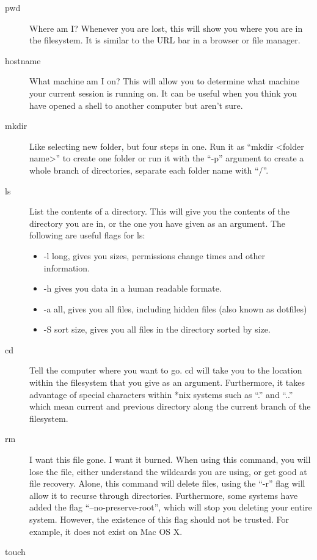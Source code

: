 		\begin{description}
			\item[pwd]
				Where am I?
				Whenever you are lost, this will show you where you are in the filesystem.
				It is similar to the URL bar in a browser or file manager.
			\item[hostname]
				What machine am I on?
				This will allow you to determine what machine your current session is running on.
				It can be useful when you think you have opened a shell to another computer but aren't sure.
			\item[mkdir]
				Like selecting new folder, but four steps in one.
				Run it as ``mkdir <folder name>'' to create one folder or run it with the ``-p'' argument to create a whole branch of directories, separate each folder name with ``/''.
			\item[ls]
				List the contents of a directory.
				This will give you the contents of the directory you are in, or the one you have given as an argument.
				The following are useful flags for ls:
				\begin{itemize}
					\item -l long, gives you sizes, permissions change times and other information.
					\item -h gives you data in a human readable formate.
					\item -a all, gives you all files, including hidden files (also known as dotfiles)
					\item -S sort size, gives you all files in the directory sorted by size.
				\end{itemize}
			\item[cd]
				Tell the computer where you want to go.
				cd will take you to the location within the filesystem that you give as an argument.
				Furthermore, it takes advantage of special characters within \**nix systems such as ``.'' and ``..'' which mean current and previous directory along the current branch of the filesystem.
			\item[rm]
				I want this file gone. I want it burned.
				When using this command, you will lose the file, either understand the wildcards you are using, or get good at file recovery.
				Alone, this command will delete files, using the ``-r'' flag will allow it to recurse through directories.
				Furthermore, some systems have added the flag ``--no-preserve-root'', which will stop you deleting your entire system. However, the existence of this flag should not be trusted.
				For example, it does not exist on Mac OS X.
			\item[touch]

\end{description}
